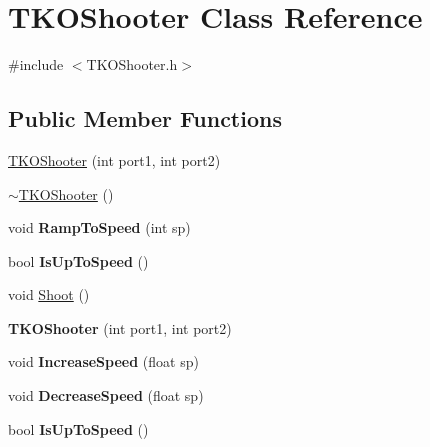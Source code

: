 \hypertarget{class_t_k_o_shooter}{\section{T\-K\-O\-Shooter Class Reference}
\label{class_t_k_o_shooter}
}


{\ttfamily \#include $<$T\-K\-O\-Shooter.\-h$>$}

\subsection*{Public Member Functions}
\begin{DoxyCompactItemize}
\item 
\hyperlink{class_t_k_o_shooter_afebd0cc2e0d128cf4ac33db914e57e56}{T\-K\-O\-Shooter} (int port1, int port2)
\item 
\hyperlink{class_t_k_o_shooter_ae3d59bb88578fa48e014887e9ebfc9f2}{$\sim$\-T\-K\-O\-Shooter} ()
\item 
\hypertarget{class_t_k_o_shooter_ad3adee7edeced6b3db5e8539fb9aede1}{void {\bfseries Ramp\-To\-Speed} (int sp)}\label{class_t_k_o_shooter_ad3adee7edeced6b3db5e8539fb9aede1}

\item 
\hypertarget{class_t_k_o_shooter_a3d5394ebe40c0112519cf50290e99dca}{bool {\bfseries Is\-Up\-To\-Speed} ()}\label{class_t_k_o_shooter_a3d5394ebe40c0112519cf50290e99dca}

\item 
void \hyperlink{class_t_k_o_shooter_ab3b3f27ccb68e0d2f17beacdf866c6d7}{Shoot} ()
\item 
\hypertarget{class_t_k_o_shooter_afebd0cc2e0d128cf4ac33db914e57e56}{{\bfseries T\-K\-O\-Shooter} (int port1, int port2)}\label{class_t_k_o_shooter_afebd0cc2e0d128cf4ac33db914e57e56}

\item 
\hypertarget{class_t_k_o_shooter_a7a17d08c1435f7a0e200d4309784af5b}{void {\bfseries Increase\-Speed} (float sp)}\label{class_t_k_o_shooter_a7a17d08c1435f7a0e200d4309784af5b}

\item 
\hypertarget{class_t_k_o_shooter_affb81e799fbb4bb327d6a9d65df968a9}{void {\bfseries Decrease\-Speed} (float sp)}\label{class_t_k_o_shooter_affb81e799fbb4bb327d6a9d65df968a9}

\item 
\hypertarget{class_t_k_o_shooter_a3d5394ebe40c0112519cf50290e99dca}{bool {\bfseries Is\-Up\-To\-Speed} ()}\label{class_t_k_o_shooter_a3d5394ebe40c0112519cf50290e99dca}


\end{DoxyCompactItemize}
